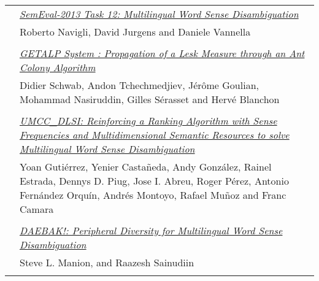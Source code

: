 \begin{tabular}{p{20mm}p{138mm}}
 & \hyperlink{page.222}{\em SemEval-2013 Task 12: Multilingual Word Sense Disambiguation}\\
         & Roberto Navigli, David Jurgens and Daniele Vannella \\
\\

 & \hyperlink{page.232}{\em GETALP System : Propagation of a Lesk Measure through an Ant Colony Algorithm}\\
         & Didier Schwab, Andon Tchechmedjiev, J\'{e}r\^{o}me Goulian, Mohammad Nasiruddin, Gilles S\'{e}rasset and Herv\'{e} Blanchon \\
\\

 & \hyperlink{page.241}{\em UMCC\_DLSI: Reinforcing a Ranking Algorithm with Sense Frequencies and Multidimensional Semantic Resources to solve Multilingual Word Sense Disambiguation}\\
         & Yoan Guti\'{e}rrez, Yenier Casta\~{n}eda, Andy Gonz\'{a}lez, Rainel Estrada, Dennys D. Piug, Jose I. Abreu, Roger P\'{e}rez, Antonio Fern\'{a}ndez Orqu\'{i}n, Andr\'{e}s Montoyo, Rafael Mu\~{n}oz and Franc Camara \\
\\

 & \hyperlink{page.250}{\em DAEBAK!: Peripheral Diversity for Multilingual Word Sense Disambiguation}\\
         & Steve L. Manion,  and Raazesh Sainudiin \\
\\

\end{tabular}
\newpage
